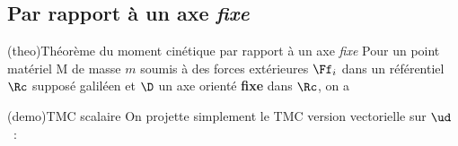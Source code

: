 \documentclass[../../main/main.tex]{subfiles}
\begin{document}
\subsection{Par rapport à un axe  \textit{fixe}}
\begin{tcb*}(theo){Théorème du moment cinétique par rapport à un axe
			 \textit{fixe}}
	Pour un point matériel M de masse $m$ soumis à des forces extérieures
	$\Ff_i$ dans un référentiel $\Rc$ supposé galiléen et $\D$ un axe
	orienté \textbf{fixe} dans $\Rc$, on a
	\psw{
		\[\boxed{\dv{\Lc_{\D}(\Mr)}{t} = \sum_i\Mc_{\D}(\Ff_i)}\]
	}
	\vspace{-15pt}
\end{tcb*}
\begin{tcb*}(demo){TMC scalaire}
	On projette simplement le TMC version vectorielle sur $\ud$~:
\end{tcb*}
\end{document}
